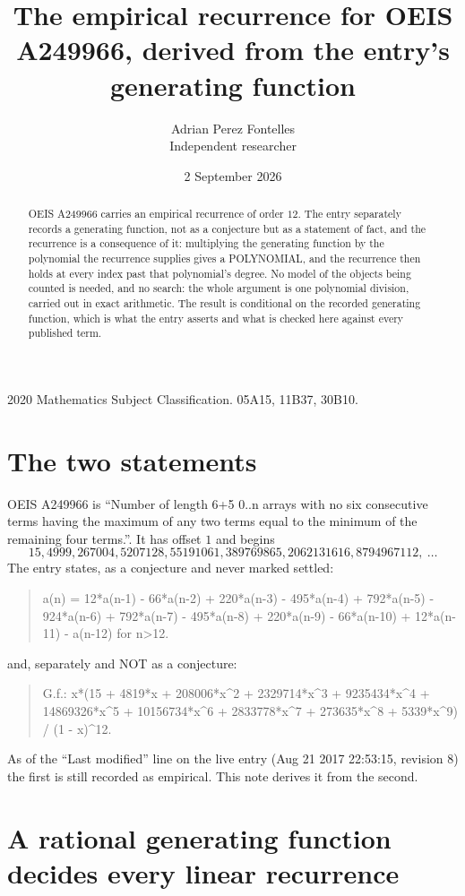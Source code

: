 \documentclass[11pt,a4paper]{article}
\title{The empirical recurrence for OEIS A249966, derived from the entry's generating function}
\author{Adrian Perez Fontelles\\ \small Independent researcher}
\date{2 September 2026}
\theoremstyle{plain}
\theoremstyle{definition}
\begin{document}
\maketitle

\begin{abstract}
OEIS A249966 carries an empirical recurrence of order $12$. The entry separately records a
generating function, not as a conjecture but as a statement of fact, and the recurrence is a
consequence of it: multiplying the generating function by the polynomial the recurrence
supplies gives a POLYNOMIAL, and the recurrence then holds at every index past that
polynomial's degree. No model of the objects being counted is needed, and no search: the
whole argument is one polynomial division, carried out in exact arithmetic. The result is
conditional on the recorded generating function, which is what the entry asserts and what is
checked here against every published term.
\end{abstract}

\noindent\small 2020 Mathematics Subject Classification. 05A15, 11B37, 30B10.\normalsize

\section{The two statements}

OEIS A249966 is ``Number of length 6+5 0..n arrays with no six consecutive terms having the maximum of any two terms equal to the minimum of the remaining four terms.''. It has offset $1$ and begins
\[
15, 4999, 267004, 5207128, 55191061, 389769865, 2062131616, 8794967112,\ \dots
\]
The entry states, as a conjecture and never marked settled:
\begin{quote}
a(n) = 12*a(n-1) - 66*a(n-2) + 220*a(n-3) - 495*a(n-4) + 792*a(n-5) - 924*a(n-6) + 792*a(n-7) - 495*a(n-8) + 220*a(n-9) - 66*a(n-10) + 12*a(n-11) - a(n-12) for n>12.
\end{quote}
and, separately and NOT as a conjecture:
\begin{quote}
G.f.: x*(15 + 4819*x + 208006*x\^{}2 + 2329714*x\^{}3 + 9235434*x\^{}4 + 14869326*x\^{}5 + 10156734*x\^{}6 + 2833778*x\^{}7 + 273635*x\^{}8 + 5339*x\^{}9) / (1 - x)\^{}12.
\end{quote}
As of the ``Last modified'' line on the live entry (Aug 21 2017 22:53:15, revision 8) the first is still
recorded as empirical. This note derives it from the second.

\section{A rational generating function decides every linear recurrence}
\end{document}
